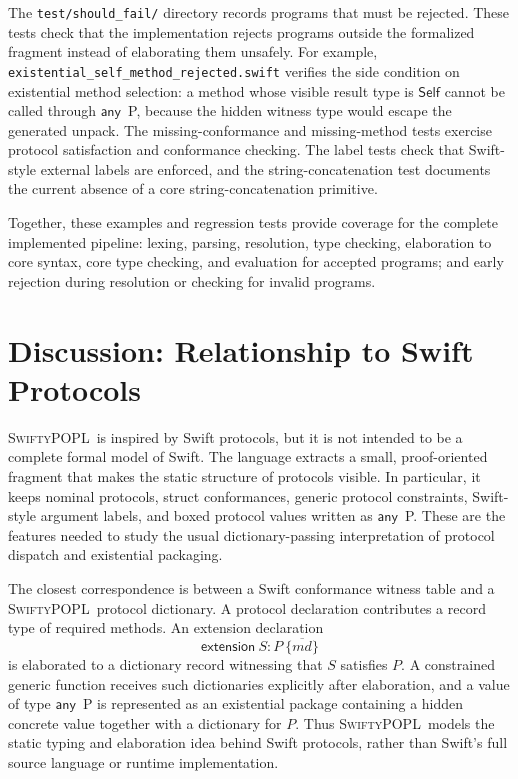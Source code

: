 \documentclass[manuscript,nonacm]{acmart}
\newcommand{\lang}{\textsc{SwiftyPOPL}}
\newcommand{\kw}[1]{\ensuremath{\mathsf{#1}}}
\newcommand{\Self}{\kw{Self}\xspace}
\newcommand{\Any}[1]{\kw{any}\ #1}
\begin{document}
The \texttt{test/should\_fail/} directory records programs that must be rejected.
These tests check that the implementation rejects programs outside the formalized fragment instead of elaborating them unsafely.
For example, \texttt{existential\_self\_method\_rejected.swift} verifies the side condition on existential method selection:
a method whose visible result type is \Self cannot be called through \Any{P}, because the hidden witness type would escape the generated unpack.
The missing-conformance and missing-method tests exercise protocol satisfaction and conformance checking.
The label tests check that Swift-style external labels are enforced, and the string-concatenation test documents the current absence of a core string-concatenation primitive.

Together, these examples and regression tests provide coverage for the complete implemented pipeline:
lexing, parsing, resolution, type checking, elaboration to core syntax, core type checking, and evaluation for accepted programs; and early rejection during resolution or checking for invalid programs.

\section{Discussion: Relationship to Swift Protocols}

\lang\ is inspired by Swift protocols, but it is not intended to be a complete formal model of Swift.
The language extracts a small, proof-oriented fragment that makes the static structure of protocols visible.
In particular, it keeps nominal protocols, struct conformances, generic protocol constraints, Swift-style argument labels, and boxed protocol values written as \Any{P}.
These are the features needed to study the usual dictionary-passing interpretation of protocol dispatch and existential packaging.

The closest correspondence is between a Swift conformance witness table and a \lang\ protocol dictionary.
A protocol declaration contributes a record type of required methods.
An extension declaration
\[
  \kw{extension}\ S : P\ \{ \overline{md} \}
\]
is elaborated to a dictionary record witnessing that $S$ satisfies $P$.
A constrained generic function receives such dictionaries explicitly after elaboration, and a value of type \Any{P} is represented as an existential package containing a hidden concrete value together with a dictionary for $P$.
Thus \lang\ models the static typing and elaboration idea behind Swift protocols, rather than Swift's full source language or runtime implementation.
\end{document}
